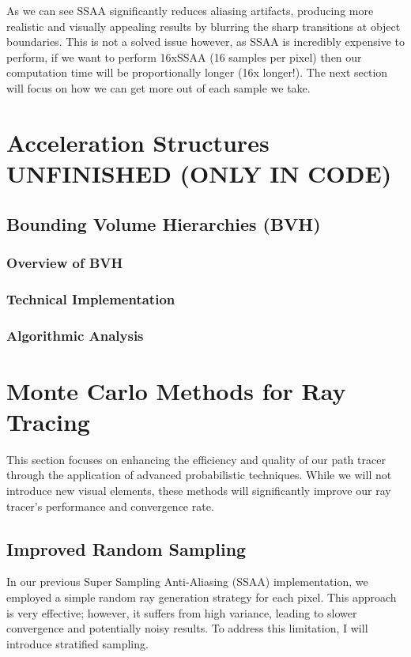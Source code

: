 \documentclass[12pt]{article}
\begin{document}
As we can see SSAA significantly reduces aliasing artifacts, producing more realistic and visually appealing results by blurring the sharp transitions at object boundaries.
This is not a solved issue however, as SSAA is incredibly expensive to perform, if we want to perform 16xSSAA (16 samples per pixel) then our computation time will be proportionally longer (16x longer!). The next section will focus on how we can get more out of each sample we take.

\section{Acceleration Structures UNFINISHED (ONLY IN CODE)}
\label{sec:acceleration-structures}
\subsection{Bounding Volume Hierarchies (BVH)}
\subsubsection{Overview of BVH}
\subsubsection{Technical Implementation}
\subsubsection{Algorithmic Analysis}

\pagebreak
\section{Monte Carlo Methods for Ray Tracing}
\label{sec:monte-carlo}

This section focuses on enhancing the efficiency and quality of our path tracer through the application of advanced probabilistic techniques. While we will not introduce new visual elements, these methods will significantly improve our ray tracer's performance and convergence rate.

\subsection{Improved Random Sampling}
In our previous Super Sampling Anti-Aliasing (SSAA) implementation, we employed a simple random ray generation strategy for each pixel. This approach is very effective; however, it suffers from high variance, leading to slower convergence and potentially noisy results. To address this limitation, I will introduce stratified sampling.
\end{document}
